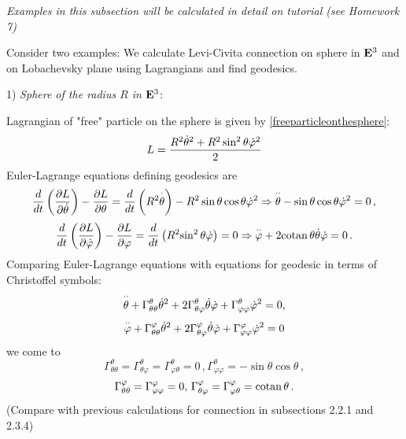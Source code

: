 \documentclass[12pt]{article}
\theoremstyle{theorem}
\numberwithin{equation}{section}
\begin{document}
{{\it Examples in this subsection will be calculated in detail on tutorial
  (see Homework 7)}

Consider two examples: We calculate Levi-Civita connection on sphere in ${\bf E}^3$ and on Lobachevsky plane
using Lagrangians and find geodesics.

1) {\it Sphere of the radius $R$ in ${\bf E}^3$}:


   Lagrangian of "free" particle on the sphere is given by \eqref{freeparticleonthesphere}:
    $$
    L={R^2\dot \theta^2+R^2\sin^2\theta\dot \varphi^2\over 2}
    $$
Euler-Lagrange equations defining geodesics are
          \begin{equation}\label{EL eqforsphere}
  {d\over dt}\left({\p L\over \p  \dot\theta}\right)-
  {\p L\over \p \theta}=
  {d\over dt} \left(R^2{\buildrel \cdot\over \theta}\right)-
  R^2\sin\theta\cos\theta\dot \varphi^2\Rightarrow  {\buildrel \cdot\cdot\over \theta}-
  \sin\theta\cos\theta\dot \varphi^2=0\,,
          \end{equation}
              $$
{d\over dt}\left({\p L\over \p  \dot\varphi}\right)-
  {\p L\over \p \varphi}=
  {d\over dt} \left(R^2{\sin^2\theta\dot\varphi}\right)=0\Rightarrow
  {\buildrel \cdot\cdot\over \varphi}+
  2{\rm cotan\,}\theta\dot\theta\dot\varphi=0\,.
                            $$
Comparing Euler-Lagrange equations with equations for geodesic in 
terms of Christoffel symbols:
         $$
   {\buildrel \cdot\cdot\over \theta}+\Gamma^\theta_{\theta\theta}\dot\theta^2+
   2\Gamma^\theta_{\theta\varphi}\dot\theta\dot\varphi+\Gamma^\theta_{\varphi\varphi}\dot\varphi^2=0,
         $$
    $$
  {\buildrel \cdot\cdot\over \varphi}+\Gamma^\varphi_{\theta\theta}\dot\theta^2+
   2\Gamma^\varphi_{\theta\varphi}\dot\theta\dot\varphi+\Gamma^\varphi_{\varphi\varphi}\dot\varphi^2=0
    $$
    we come to
 \begin{equation}\label{christsymbolsthroughlagrangiansforsphere1}
    \Gamma^\theta_{\theta\theta}=
    \Gamma^\theta_{\theta\varphi}=\Gamma^\theta_{\varphi\theta}=0\,,
    \Gamma^\theta_{\varphi\varphi}=-\sin\theta\cos\theta\,,
 \end{equation}
 \begin{equation}\label{christsymbolsthroughlagrangiansforsphere2}
    \Gamma^\varphi_{\theta\theta}=\Gamma^\varphi_{\varphi\varphi}=0,\,
    \Gamma^\varphi_{\theta\varphi}=\Gamma^\varphi_{\varphi\theta}={\rm cotan\, }\theta\,.
 \end{equation}
 (Compare with previous calculations for connection in subsections 2.2.1 and 2.3.4)

}
\end{document}
